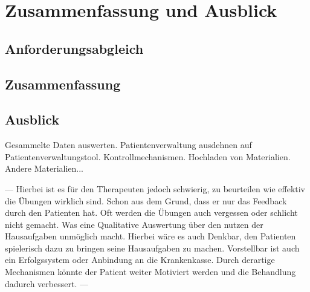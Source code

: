 \chapter{Zusammenfassung und Ausblick} \label{Zusammenfassung und Ausblick}

\section{Anforderungsabgleich}
\section{Zusammenfassung}
\section{Ausblick}
Gesammelte Daten auswerten.
Patientenverwaltung ausdehnen auf Patientenverwaltungstool.
Kontrollmechanismen.
Hochladen von Materialien.
Andere Materialien...



---
 Hierbei ist es für den Therapeuten jedoch schwierig, zu beurteilen wie effektiv die Übungen wirklich sind. Schon aus dem Grund, dass er nur das Feedback durch den Patienten hat. Oft werden die Übungen auch vergessen oder schlicht nicht gemacht. Was eine Qualitative Auswertung über den nutzen der Hausaufgaben unmöglich macht.  Hierbei wäre es auch Denkbar, den Patienten spielerisch dazu zu bringen seine Hausaufgaben zu machen. Vorstellbar ist auch ein Erfolgssystem oder Anbindung an die Krankenkasse. Durch derartige Mechanismen könnte der Patient weiter Motiviert werden und die Behandlung dadurch verbessert. 
 ---